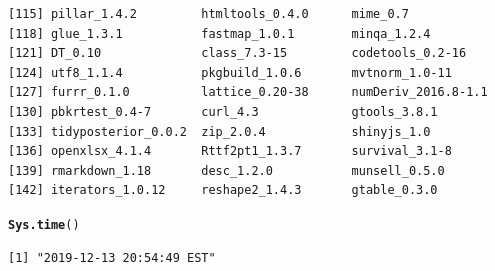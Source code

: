 \documentclass{article}\usepackage[]{graphicx}\usepackage[]{color}
\makeatletter
\newcommand{\hlstd}[1]{\textcolor[rgb]{0.345,0.345,0.345}{#1}}%
\newcommand{\hlkwd}[1]{\textcolor[rgb]{0.737,0.353,0.396}{\textbf{#1}}}%
\newenvironment{kframe}{%
 \def\at@end@of@kframe{}%
 \ifinner\ifhmode%
  \def\at@end@of@kframe{\end{minipage}}%
  \begin{minipage}{\columnwidth}%
 \fi\fi%
 \def\FrameCommand##1{\hskip\@totalleftmargin \hskip-\fboxsep
 \colorbox{shadecolor}{##1}\hskip-\fboxsep
     \hskip-\linewidth \hskip-\@totalleftmargin \hskip\columnwidth}%
 \MakeFramed {\advance\hsize-\width
   \@totalleftmargin\z@ \linewidth\hsize
   \@setminipage}}%
 {\par\unskip\endMakeFramed%
 \at@end@of@kframe}
\newenvironment{knitrout}{}{} %
\makeatother
\begin{document}
\begin{knitrout}
\begin{kframe}
\begin{verbatim}
[115] pillar_1.4.2         htmltools_0.4.0      mime_0.7            
[118] glue_1.3.1           fastmap_1.0.1        minqa_1.2.4         
[121] DT_0.10              class_7.3-15         codetools_0.2-16    
[124] utf8_1.1.4           pkgbuild_1.0.6       mvtnorm_1.0-11      
[127] furrr_0.1.0          lattice_0.20-38      numDeriv_2016.8-1.1 
[130] pbkrtest_0.4-7       curl_4.3             gtools_3.8.1        
[133] tidyposterior_0.0.2  zip_2.0.4            shinyjs_1.0         
[136] openxlsx_4.1.4       Rttf2pt1_1.3.7       survival_3.1-8      
[139] rmarkdown_1.18       desc_1.2.0           munsell_0.5.0       
[142] iterators_1.0.12     reshape2_1.4.3       gtable_0.3.0        
\end{verbatim}
\begin{alltt}
\hlkwd{Sys.time}\hlstd{()}
\end{alltt}
\begin{verbatim}
[1] "2019-12-13 20:54:49 EST"
\end{verbatim}
\end{kframe}
\end{knitrout}
\end{document}
